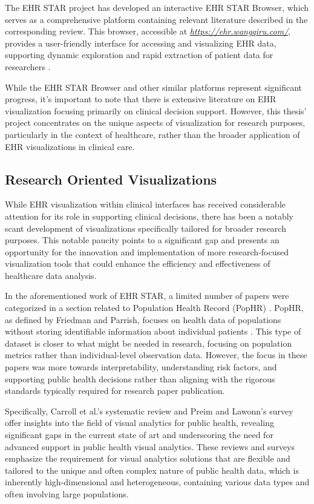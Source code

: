 The EHR STAR project has developed an interactive EHR STAR Browser, which serves as a comprehensive platform containing relevant literature described in the corresponding review. This browser, accessible at \emph{\url{https://ehr.wangqiru.com/}}, provides a user-friendly interface for accessing and visualizing EHR data, supporting dynamic exploration and rapid extraction of patient data for researchers \cite{soa8}.

While the EHR STAR Browser and other similar platforms represent significant progress, it's important to note that there is extensive literature on EHR visualization focusing primarily on clinical decision support. However, this thesis' project concentrates on the unique aspects of visualization for research purposes, particularly in the context of healthcare, rather than the broader application of EHR visualizations in clinical care.

\subsection{Research Oriented Visualizations}\label{research-oriented-visualizations}

While EHR visualization within clinical interfaces has received considerable attention for its role in supporting clinical decisions, there has been a notably scant development of visualizations specifically tailored for broader research purposes. This notable paucity points to a significant gap and presents an opportunity for the innovation and implementation of more research-focused visualization tools that could enhance the efficiency and effectiveness of healthcare data analysis.

In the aforementioned work of EHR STAR, a limited number of papers were categorized in a section related to Population Health Record (PopHR) \cite{soa9}. PopHR, as defined by Friedman and Parrish, focuses on health data of populations without storing identifiable information about individual patients \cite{soa22}. This type of dataset is closer to what might be needed in research, focusing on population metrics rather than individual-level observation data. However, the focus in these papers was more towards interpretability, understanding risk factors, and supporting public health decisions rather than aligning with the rigorous standards typically required for research paper publication.

Specifically, Carroll et al.'s systematic review \cite{soa23} and Preim and Lawonn's survey \cite{soa12} offer insights into the field of visual analytics for public health, revealing significant gaps in the current state of art and underscoring the need for advanced support in public health visual analytics. These reviews and surveys emphasize the requirement for visual analytics solutions that are flexible and tailored to the unique and often complex nature of public health data, which is inherently high-dimensional and heterogeneous, containing various data types and often involving large populations.


